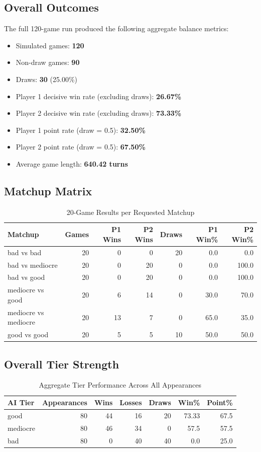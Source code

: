 \documentclass[12pt]{article}
\begin{document}
\subsection{Overall Outcomes}
The full 120-game run produced the following aggregate balance metrics:
\begin{itemize}
\item Simulated games: \textbf{120}
\item Non-draw games: \textbf{90}
\item Draws: \textbf{30} (25.00\%)
\item Player 1 decisive win rate (excluding draws): \textbf{26.67\%}
\item Player 2 decisive win rate (excluding draws): \textbf{73.33\%}
\item Player 1 point rate (draw = 0.5): \textbf{32.50\%}
\item Player 2 point rate (draw = 0.5): \textbf{67.50\%}
\item Average game length: \textbf{640.42 turns}
\end{itemize}
\subsection{Matchup Matrix}
\begin{table}[H]
\centering
\caption{20-Game Results per Requested Matchup}
\begin{tabular}{lrrrrrr}
\toprule
Matchup & Games & P1 Wins & P2 Wins & Draws & P1 Win\% & P2 Win\% \\
\midrule
bad vs bad & 20 & 0 & 0 & 20 & 0.0 & 0.0 \\
bad vs mediocre & 20 & 0 & 20 & 0 & 0.0 & 100.0 \\
bad vs good & 20 & 0 & 20 & 0 & 0.0 & 100.0 \\
mediocre vs good & 20 & 6 & 14 & 0 & 30.0 & 70.0 \\
mediocre vs mediocre & 20 & 13 & 7 & 0 & 65.0 & 35.0 \\
good vs good & 20 & 5 & 5 & 10 & 50.0 & 50.0 \\
\bottomrule
\end{tabular}
\end{table}
\subsection{Overall Tier Strength}
\begin{table}[H]
\centering
\caption{Aggregate Tier Performance Across All Appearances}
\begin{tabular}{lrrrrrr}
\toprule
AI Tier & Appearances & Wins & Losses & Draws & Win\% & Point\% \\
\midrule
good & 80 & 44 & 16 & 20 & 73.33 & 67.5 \\
mediocre & 80 & 46 & 34 & 0 & 57.5 & 57.5 \\
bad & 80 & 0 & 40 & 40 & 0.0 & 25.0 \\
\bottomrule
\end{tabular}
\end{table}
\end{document}
